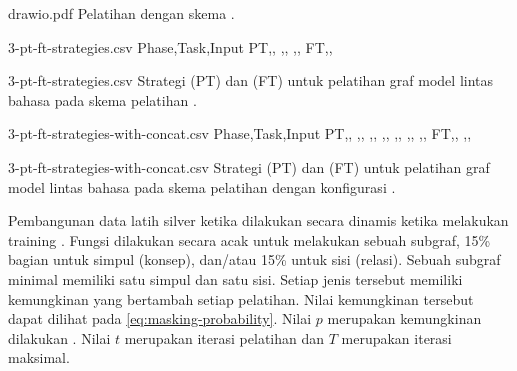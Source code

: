   {drawio.pdf}
  {Pelatihan dengan skema .}

\begin{filecontents*}{3-pt-ft-strategies.csv}
Phase,Task,Input
PT,,\makecell[cl]{\sTagged{[mask]}\graphMasked{}}
,,
,,
FT,,
\end{filecontents*}
  {3-pt-ft-strategies.csv}
  {Strategi \pretraining{} (PT) dan \finetuning{} (FT) untuk pelatihan graf model \amrparsing{} lintas bahasa pada skema pelatihan .}

\begin{filecontents*}{3-pt-ft-strategies-with-concat.csv}
Phase,Task,Input
PT,,\makecell[cl]{\idTagged{[mask]}\enTagged{[mask]}\graphMasked{}}
,,
,,
,,
,,
,,
,,
FT,,
,,
\end{filecontents*}
  {3-pt-ft-strategies-with-concat.csv}
  {Strategi \pretraining{} (PT) dan \finetuning{} (FT) untuk pelatihan graf model \amrparsing{} lintas bahasa pada skema pelatihan  dengan konfigurasi .}

Pembangunan data latih silver ketika \pretraining{} dilakukan  secara dinamis ketika melakukan training .
Fungsi  dilakukan secara acak untuk melakukan  sebuah subgraf, 15\% bagian untuk  simpul (konsep), dan/atau 15\% untuk  sisi (relasi).
Sebuah subgraf minimal memiliki satu simpul dan satu sisi.
Setiap jenis  tersebut memiliki kemungkinan yang bertambah setiap  pelatihan.
Nilai kemungkinan tersebut dapat dilihat pada \cref{eq:masking-probability}.
Nilai $p$ merupakan kemungkinan dilakukan .
Nilai $t$ merupakan iterasi pelatihan dan $T$ merupakan iterasi maksimal.

